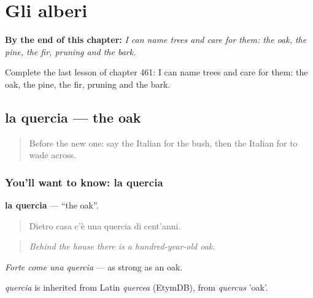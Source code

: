 
\chapter{Gli alberi}
\label{ch:it-gli-alberi}

\begin{chapteropening}
\textbf{By the end of this chapter:} \emph{I can name trees and care for them: the oak, the pine, the fir, pruning and the bark.}

Complete the last lesson of chapter 461: I can name trees and care for them: the oak, the pine, the fir, pruning and the bark.
\end{chapteropening}

\section[la quercia]{la quercia — the oak}

\label{lesson:IT-C461-quercia}



\begin{quote}
Before the new one: say the Italian for the bush, then the Italian for to wade across.
\end{quote}

\subsection*{You'll want to know: la quercia}
\textbf{la quercia} — \textquotedblleft{}the oak\textquotedblright{}.

\begin{quote}
Dietro casa c'è una quercia di cent'anni.
\end{quote}

\begin{quote}
\emph{Behind the house there is a hundred-year-old oak.}
\end{quote}

\emph{Forte come una quercia} — as strong as an oak.

\begin{cousinweb}
\emph{quercia} is inherited from Latin \emph{quercea} (EtymDB), from \emph{quercus} 'oak'.
\end{cousinweb}

